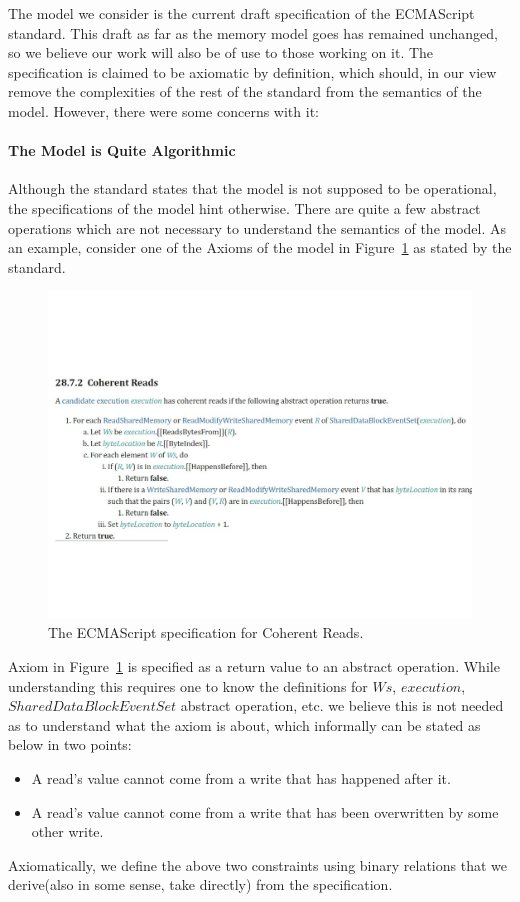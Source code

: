 
The model we consider is the current draft specification \cite{ECMA} of the ECMAScript standard. 
This draft as far as the memory model goes has remained unchanged, so we believe our work will also be of use to those working on it. 
The specification is claimed to be axiomatic by definition, which should, in our view remove the complexities of the rest of the standard from the semantics of the model.
However, there were some concerns with it: 

\paragraph{The Model is Quite Algorithmic}
    Although the standard states that the model is not supposed to be operational, the specifications of the model hint otherwise. 
    There are quite a few abstract operations which are not necessary to understand the semantics of the model. 
    As an example, consider one of the Axioms of the model in Figure~\ref{model:Std1} as stated by the standard. 
    \begin{figure}[H]
        \centering 
        \includegraphics[scale=0.6]{4.ECMAScriptMemoryModel/ECMAScriptStdCoherentReads.pdf}
        \caption{The ECMAScript specification for Coherent Reads.}
        \label{model:Std1}
    \end{figure}
    Axiom in Figure~\ref{model:Std1} is specified as a return value to an abstract operation. While understanding this requires one to know the definitions for $Ws$, $execution$, $SharedDataBlockEventSet$ abstract operation, etc. we believe this is not needed as to understand what the axiom is about, which informally can be stated as below in two points:
    \begin{itemize}
        \item A read's value cannot come from a write that has happened after it. 
        \item A read's value cannot come from a write that has been overwritten by some other write.  
    \end{itemize}
    Axiomatically, we define the above two constraints using binary relations that we derive(also in some sense, take directly) from the specification. 
    

